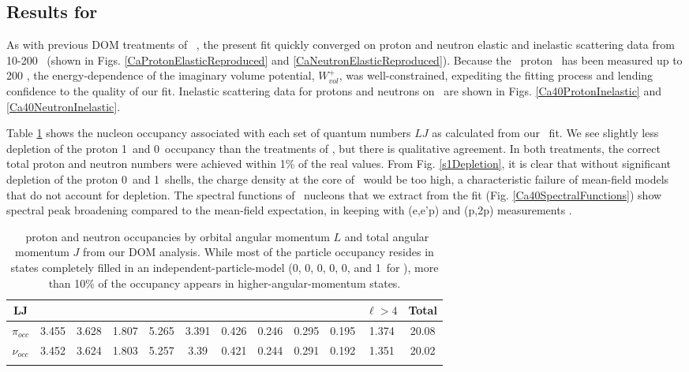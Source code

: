 \subsection{Results for \caForty}
As with previous DOM treatments of \caForty\ \cite{MahzoonPhDThesis, Mahzoon2014}, the present fit
quickly converged on proton and neutron elastic and inelastic scattering data from 10-200
\mega\electronvolt\ (shown in Figs. \ref{CaProtonElasticReproduced} and
\ref{CaNeutronElasticReproduced}). Because the \caForty\ proton \rxn\ 
has been
measured up to 200 \mega\electronvolt, the energy-dependence of the imaginary volume potential, 
$W_{vol}^{+}$, was well-constrained, expediting the fitting process
and lending confidence to the quality of our fit. Inelastic scattering data for
protons and neutrons on \caForty\ are shown in Figs. \ref{Ca40ProtonInelastic}
and \ref{Ca40NeutronInelastic}. 

Table \ref{Ca40ParticleNumber} shows the nucleon occupancy associated with each
set of quantum numbers $LJ$ as calculated from our \caForty\ fit. We see
slightly less depletion of the proton 1\sOne\ and 0\dThree\ occupancy than the
treatments of \cite{MahzoonPhDThesis, Mahzoon2017}, but there is qualitative
agreement. In both treatments, the correct total proton and neutron numbers were
achieved within 1\% of the real values. From Fig. \ref{s1Depletion}, it is clear
that without significant depletion
of the proton 0\sOne\ and 1\sOne\ shells, the charge density at the core of
\caForty\ would be too high,
a characteristic failure of mean-field models that do not account for depletion. 
The spectral functions of \caForty\ nucleons that 
we extract from the fit (Fig. \ref{Ca40SpectralFunctions})
show spectral peak broadening compared 
to the mean-field expectation, in keeping with (e,e'p) and (p,2p) measurements
\cite{Jacob1966, Jacob1973}.

\begin{table}[tb]
    \caption[\caForty\ proton and neutron occupancies from our DOM analysis]
    {
        \caForty\ proton and neutron occupancies by orbital angular momentum
        $L$ and total angular momentum $J$ from our DOM analysis. While
        most of the particle occupancy resides in states completely
        filled in an independent-particle-model (0\sOne, 0\pThree, 0\pOne, 0\dFive, 0\dThree,
        and 1\sOne\ for \caForty), more than 10\% of the occupancy appears in
        higher-angular-momentum states.
    }
    \centering
    \begin{tabular}{c c c c c c c c c c c c}
                \toprule
                LJ & \sOne & \pThree & \pOne & \dFive & \dThree & \fSeven & \fFive &
                \gNine & \gSeven & $\ell>4$ & Total\\
                \midrule
                $\pi_{occ}$ & 3.455 & 3.628 & 1.807 & 5.265 & 3.391 & 0.426 &
                0.246 & 0.295 & 0.195 & 1.374 & 20.08\\
                $\nu_{occ}$ & 3.452 & 3.624 & 1.803 & 5.257 & 3.39 & 0.421 &
                0.244 & 0.291 & 0.192 & 1.351 & 20.02\\
                \bottomrule
                \label{Ca40ParticleNumber}
    \end{tabular}
\end{table}

